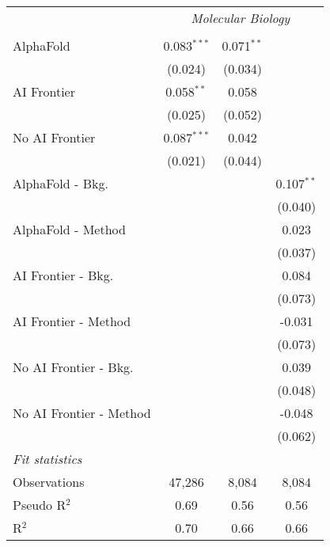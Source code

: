 \begin{tabular}{lccc}
 & \multicolumn{3}{c}{\textit{Molecular Biology}} \\ \\
   AlphaFold               & 0.083$^{***}$ & 0.071$^{**}$ &   \\   
                           & (0.024)       & (0.034)      &   \\   
   AI Frontier             & 0.058$^{**}$  & 0.058        &   \\   
                           & (0.025)       & (0.052)      &   \\   
   No AI Frontier          & 0.087$^{***}$ & 0.042        &   \\   
                           & (0.021)       & (0.044)      &   \\   
   AlphaFold - Bkg.        &               &              & 0.107$^{**}$\\   
                           &               &              & (0.040)\\   
   AlphaFold - Method      &               &              & 0.023\\   
                           &               &              & (0.037)\\   
   AI Frontier - Bkg.      &               &              & 0.084\\   
                           &               &              & (0.073)\\   
   AI Frontier - Method    &               &              & -0.031\\   
                           &               &              & (0.073)\\   
   No AI Frontier - Bkg.   &               &              & 0.039\\   
                           &               &              & (0.048)\\   
   No AI Frontier - Method &               &              & -0.048\\   
                           &               &              & (0.062)\\   
   \midrule
   \emph{Fit statistics}\\
   Observations            & 47,286        & 8,084        & 8,084\\  
   Pseudo R$^2$            & 0.69          & 0.56         & 0.56\\  
   R$^2$                   & 0.70          & 0.66         & 0.66\\  
   

\end{tabular}
